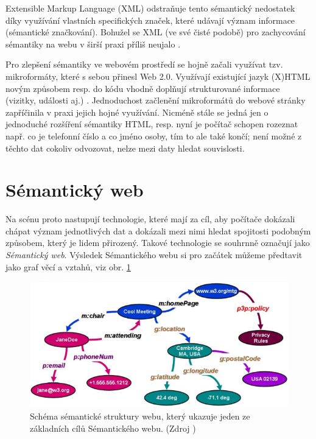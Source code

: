 Extensible Markup Language (XML) odstraňuje tento sémantický nedostatek díky využívání vlastních specifických značek, které udávají význam informace (sémantické značkování). Bohužel se XML (ve své čisté podobě) pro zachycování sémantiky na webu v širší praxi příliš neujalo \cite{europen}. 

Pro zlepšení sémantiky ve webovém prostředí se hojně začali využívat tzv. mikroformáty, které s sebou přinesl Web 2.0. Využívají existující jazyk (X)HTML novým způsobem resp. do kódu vhodně doplňují strukturované informace (vizitky, události aj.) \cite{microformat}.
Jednoduchost začlenění mikroformátů do webové stránky zapříčinila v praxi jejich hojné využívání.
Nicméně stále se jedná jen o jednoduché rozšíření sémantiky HTML, resp. nyní je počítač schopen rozeznat např. co je telefonní číslo a co jméno osoby, tím to ale také končí; není možné z těchto dat cokoliv odvozovat, nelze mezi daty hledat souvislosti.

\section{Sémantický web}

Na scénu proto nastupují technologie, které mají za cíl, aby počítače dokázali chápat význam jednotlivých dat a dokázali mezi nimi hledat spojitosti podobným způsobem, který je lidem přirozený. Takové technologie se souhrnně označují jako \textit{Sémantický web}.
Výsledek Sémantického webu si pro začátek můžeme předtavit jako graf věcí a vztahů, viz obr. \ref{img:futureWebSchema} 

\begin{figure}[h]
\begin{center}
\includegraphics[width=12cm]{figures/futureWebSchema}
\caption{Schéma sémantické struktury webu, který ukazuje jeden ze základních cílů Sémantického webu. (Zdroj \cite{holyj_webexpo})}
\label{img:futureWebSchema}
\end{center}
\end{figure}

